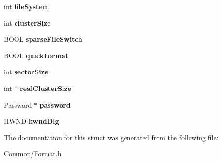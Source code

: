 \begin{DoxyCompactItemize}
int {\bfseries file\+System}
\item 
\mbox{\label{struct_f_o_r_m_a_t___v_o_l___p_a_r_a_m_e_t_e_r_s_a2d39087c9275c967c939e757ac080ffc}} 
int {\bfseries cluster\+Size}
\item 
\mbox{\label{struct_f_o_r_m_a_t___v_o_l___p_a_r_a_m_e_t_e_r_s_a660ddedd8e333a54f3e927c2bf561238}} 
B\+O\+OL {\bfseries sparse\+File\+Switch}
\item 
\mbox{\label{struct_f_o_r_m_a_t___v_o_l___p_a_r_a_m_e_t_e_r_s_a56d7e3a12e97570108f357ebcd392c30}} 
B\+O\+OL {\bfseries quick\+Format}
\item 
\mbox{\label{struct_f_o_r_m_a_t___v_o_l___p_a_r_a_m_e_t_e_r_s_ae054311c7e6aed01ec985bec10ec53f3}} 
int {\bfseries sector\+Size}
\item 
\mbox{\label{struct_f_o_r_m_a_t___v_o_l___p_a_r_a_m_e_t_e_r_s_ace66df9327bd9cb9349898b977ac8ab2}} 
int $\ast$ {\bfseries real\+Cluster\+Size}
\item 
\mbox{\label{struct_f_o_r_m_a_t___v_o_l___p_a_r_a_m_e_t_e_r_s_a0b6e50e8c399cda08e0029c78857a586}} 
\hyperlink{struct_password}{Password} $\ast$ {\bfseries password}
\item 
\mbox{\label{struct_f_o_r_m_a_t___v_o_l___p_a_r_a_m_e_t_e_r_s_a495aef749f53940828145bc551f61b8a}} 
H\+W\+ND {\bfseries hwnd\+Dlg}
\end{DoxyCompactItemize}


The documentation for this struct was generated from the following file\+:\begin{DoxyCompactItemize}
\item 
Common/Format.\+h\end{DoxyCompactItemize}

